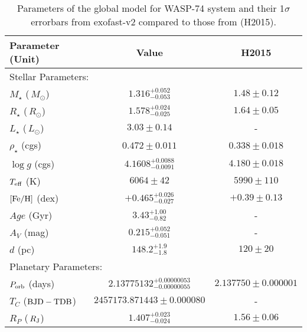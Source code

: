 \documentclass[a4paper,fleqn,usenatbib]{mnras}
\begin{document}
\providecommand{\bjdtdb}{\ensuremath{\rm {BJD-TDB}}}
\providecommand{\feh}{\ensuremath{\left[{\rm Fe}/{\rm H}\right]}}
\providecommand{\teff}{\ensuremath{T_{\rm eff}}}
\providecommand{\ecosw}{\ensuremath{e\cos{\omega_*}}}
\providecommand{\esinw}{\ensuremath{e\sin{\omega_*}}}
\providecommand{\msun}{\ensuremath{\,M_\odot}}
\providecommand{\rsun}{\ensuremath{\,R_\odot}}
\providecommand{\lsun}{\ensuremath{\,L_\odot}}
\providecommand{\mj}{\ensuremath{\,M_{\rm J}}}
\providecommand{\rj}{\ensuremath{\,R_{\rm J}}}
\providecommand{\me}{\ensuremath{\,M_{\rm E}}}
\providecommand{\re}{\ensuremath{\,R_{\rm E}}}
\providecommand{\fave}{\langle F \rangle}
\providecommand{\fluxcgs}{10$^9$ erg s$^{-1}$ cm$^{-2}$}
\renewcommand*{\arraystretch}{1.3}
\begin{table}
   \scriptsize
\caption{Parameters of the global model for WASP-74 system and their 1$\sigma$ errorbars from {\sc exofast}-v2 compared to those from \citet{2015AJ....150...18H} (H2015).}
\begin{tabular}{lcc}
\hline \hline
Parameter (Unit) & Value & H2015\\
\hline
\multicolumn{2}{l}{Stellar Parameters:} \\
\hline
$M_{\star}$ (\msun) & $1.316^{+0.052}_{-0.053}$ & $1.48\pm0.12$\\
$R_{\star}$ (\rsun) & $1.578^{+0.024}_{-0.025}$ &  $1.64\pm0.05$\\
$L_{\star}$ (\lsun) & $3.03\pm0.14$ & -\\
$\rho_{\star}$ (cgs) & $0.472\pm0.011$ & $0.338\pm0.018$\\
$\log{g}$ (cgs) & $4.1608^{+0.0088}_{-0.0091}$ & $4.180\pm0.018$\\
$T_{\rm eff}$ (K) & $6064\pm42$ & $5990\pm110$ \\
$[{\rm Fe/H}]$ (dex) & $+0.465^{+0.026}_{-0.027}$ & $+0.39\pm0.13$\\
$Age$ (Gyr) & $3.43^{+1.00}_{-0.82}$ & - \\
$A_V$ (mag) & $0.215^{+0.052}_{-0.051}$ & -\\
$d$ (pc) & $148.2^{+1.9}_{-1.8}$ & $120\pm20$\\
\hline
\multicolumn{2}{l}{Planetary Parameters:}\\
\hline
$P_{\rm orb}$ (days) &$2.13775132^{+0.00000053}_{-0.00000055}$ & $2.137750 \pm 0.000001$\\
$T_C$ (\bjdtdb)&$2457173.871443\pm0.000080$ & -\\
$R_P$ (\rj)& $1.407^{+0.023}_{-0.024}$ & $1.56\pm0.06$ \\

\end{tabular}
\end{table}
\end{document}
